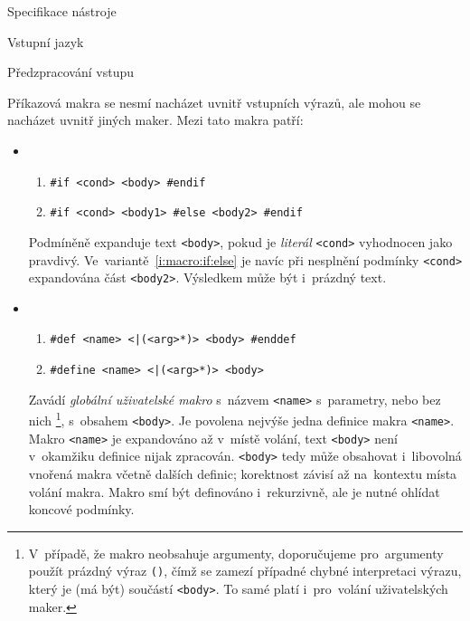 \documentclass[thesis=M,czech]{FITthesis}[2012/06/26]
\newcommand{\id}[1]{\texttt{#1}}
\newcommand{\hl}[1]{\textit{#1}}
\newcommand{\rf}[1]{\ref{#1}}
\begin{document}
\begin{section}{Specifikace nástroje}
\begin{subsection}{Vstupní jazyk}
\begin{subsubsection}{Předzpracování vstupu}
\begin{paragraph}{Příkazová makra}
\label{p:design:spec:ilang:macros:cmd}
se nesmí nacházet uvnitř vstupních výrazů,
ale mohou se nacházet uvnitř jiných maker.
Mezi tato makra patří:
\begin{itemize}
\item
   \begin{enumerate}
   \item \label{i:macro:if:if}
      \id{\#if <cond> <body> \#endif}
   \item \label{i:macro:if:else}
      \id{\#if <cond> <body1> \#else <body2> \#endif}
   \end{enumerate}
   Podmíněně expanduje text \id{<body>},
   pokud je \hl{literál} \id{<cond>} vyhodnocen jako pravdivý.
   Ve~variantě~\rf{i:macro:if:else}
   je navíc při nesplnění podmínky \id{<cond>}
   expandována část \id{<body2>}.
   Výsledkem může být i~prázdný text.
\item
   \begin{enumerate}
   \item \label{i:macro:def:def}
      \id{\#def <name> <|(<arg>*)> <body> \#enddef}
   \item \label{i:macro:def:define}
      \id{\#define <name> <|(<arg>*)> <body>}
   \end{enumerate}
   Zavádí \hl{globální uživatelské makro} s~názvem \id{<name>}
   s~parametry, nebo bez nich%
   \footnote{V~případě, že makro neobsahuje argumenty,
   doporučujeme pro~argumenty použít prázdný výraz \id{()},
   čímž se zamezí případné chybné interpretaci výrazu,
   který je (má být) součástí \id{<body>}.
   To samé platí i~pro~volání uživatelských maker.},
   s~obsahem \id{<body>}.
   Je povolena nejvýše jedna definice makra \id{<name>}.
   Makro \id{<name>} je expandováno až v~místě volání,
   text \id{<body>} není v~okamžiku definice nijak zpracován.
   \id{<body>} tedy může obsahovat i~libovolná vnořená makra
   včetně dalších definic; korektnost závisí až na~kontextu
   místa volání makra. Makro smí být definováno i~rekurzivně,
   ale je nutné ohlídat koncové podmínky.


\end{itemize}
\end{paragraph}
\end{subsubsection}
\end{subsection}
\end{section}
\end{document}
